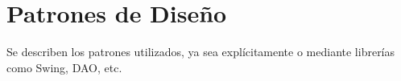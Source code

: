 \chapter{Patrones de Diseño}

Se describen los patrones utilizados, ya sea explícitamente o mediante librerías como Swing, DAO, etc.
